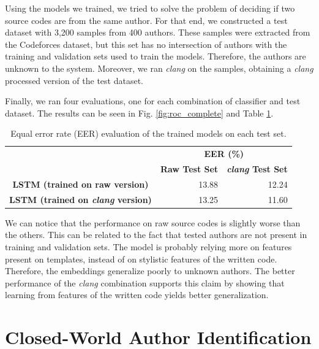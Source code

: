 Using the models we trained, we tried to solve the problem of deciding if two source codes are from the same author. For that end, we constructed a test dataset with 3,200 samples from 400 authors. These samples were extracted from the Codeforces dataset, but this set has no intersection of authors with the training and validation sets used to train the models. Therefore, the authors are unknown to the system. Moreover, we ran \textit{clang} on the samples, obtaining a \textit{clang} processed version of the test dataset.

Finally, we ran four evaluations, one for each combination of classifier and test dataset. The results can be seen in Fig. \ref{fig:roc_complete} and  Table \ref{tab:matching}.

\begin{table}[ht]
	\centering
	\begin{tabular}{ccr}
		\cline{2-3}
		\multicolumn{1}{l}{}                     & \multicolumn{2}{c}{\textbf{EER (\%)}}                                   \\ \cline{2-3} 
		\textbf{}                                & \textbf{Raw Test Set}     & \multicolumn{1}{l}{\textbf{\textit{clang} Test Set}} \\ \hline
		\textbf{LSTM (trained on raw version)}   & \multicolumn{1}{r}{13.88} & 12.24                                       \\ \hline
		\textbf{LSTM (trained on \textit{clang} version)} & \multicolumn{1}{r}{13.25} & 11.60                                        \\ \hline
	\end{tabular}
	\caption{Equal error rate (EER) evaluation of the trained models on each test set.}
	\label{tab:matching}
\end{table}

We can notice that the performance on raw source codes is slightly worse than the others. This can be related to the fact that tested authors are not present in training and validation sets. The model is probably relying more on features present on templates, instead of on stylistic features of the written code. Therefore, the embeddings generalize poorly to unknown authors. The better performance of the \textit{clang} combination supports this claim by showing that learning from features of the written code yields better generalization.

\section{Closed-World Author Identification}

